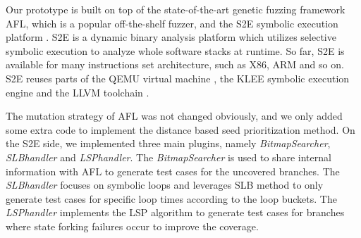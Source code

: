Our prototype is built on top of the state-of-the-art genetic fuzzing framework AFL, which is a popular off-the-shelf fuzzer, and the S2E symbolic execution platform \cite{chipounov2011s2e}. S2E is a dynamic binary analysis platform which utilizes selective symbolic execution to analyze whole software stacks at runtime. So far, S2E is available for many instructions set architecture, such as X86, ARM and so on. S2E reuses parts of the QEMU virtual machine \cite{bellard2005qemu}, the KLEE symbolic execution engine \cite{cadar2008klee} and the LLVM toolchain \cite{lattner2004llvm}.

The mutation strategy of AFL was not changed obviously, and we only added some extra code to implement the distance based seed prioritization method. On the S2E side, we implemented three main plugins, namely \textit{BitmapSearcher}, \textit{SLBhandler} and \textit{LSPhandler}. The \textit{BitmapSearcher} is used to share internal information with AFL to generate test cases for the uncovered branches. The \textit{SLBhandler} focuses on symbolic loops and leverages SLB method to only generate test cases for specific loop times according to the loop buckets. The \textit{LSPhandler} implements the LSP algorithm to generate test cases for branches where state forking failures occur to improve the coverage.
